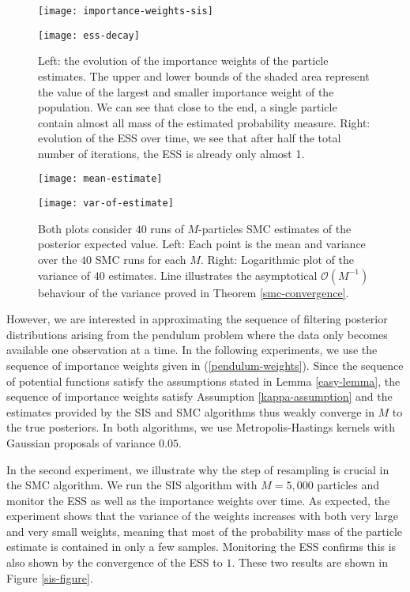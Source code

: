 \begin{figure}[htbp]
  \begin{minipage}{.5\textwidth}
    \texttt{[image: importance-weights-sis]}
  \end{minipage}
  \begin{minipage}{.5\textwidth}
    \texttt{[image: ess-decay]}
  \end{minipage}
  \caption{Left: the evolution of the importance weights of the particle estimates. The upper and lower bounds of the shaded area represent the value of the largest and smaller importance weight of the population. We can see that close to the end, a single particle contain almost all mass of the estimated probability measure. Right: evolution of the ESS over time, we see that after half the total number of iterations, the ESS is already only almost 1.}\label{sis-figure}

  \bigskip

  \begin{minipage}{.5\textwidth}
    \texttt{[image: mean-estimate]}
  \end{minipage}
  \begin{minipage}{.5\textwidth}
    \texttt{[image: var-of-estimate]}
  \end{minipage}
  \caption{Both plots consider $40$ runs of $M$-particles SMC estimates of the posterior expected value. Left: Each point is the mean and variance over the $40$ SMC runs for each $M$. Right: Logarithmic plot of the variance of $40$ estimates. Line illustrates the asymptotical $\mathcal{O}(M^{-1})$ behaviour of the variance proved in Theorem \ref{smc-convergence}. }
  \label{smc-figure}
\end{figure}

However, we are interested in approximating the sequence of filtering posterior distributions arising from the pendulum problem where the data only becomes available one observation at a time. In the following experiments, we use the sequence of importance weights given in (\ref{pendulum-weights}). Since the sequence of potential functions satisfy the assumptions stated in Lemma \ref{easy-lemma}, the sequence of importance weights  satisfy Assumption \ref{kappa-assumption} and the estimates provided by the SIS and SMC algorithms thus weakly converge in $M$ to the true posteriors. In both algorithms, we use Metropolis-Hastings kernels with Gaussian proposals of variance $0.05$. 

In the second experiment, we illustrate why the step of resampling is crucial in the SMC algorithm. We run the SIS algorithm with $M=5,000$ particles and monitor the ESS as well as the importance weights over time. As expected, the experiment shows that the variance of the weights increases with both very large and very small weights, meaning that most of the probability mass of the particle estimate is contained in only a few samples. Monitoring the ESS confirms this is also shown by the convergence of the ESS to $1$. These two results are shown in Figure \ref{sis-figure}.

